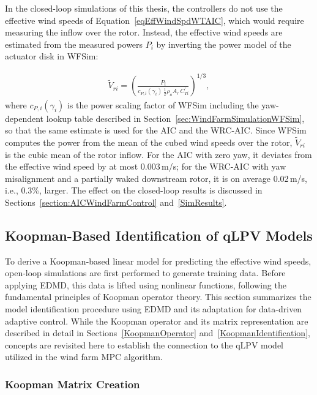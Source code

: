 In the closed-loop simulations of this thesis, the controllers do not use the effective wind speeds of Equation~\eqref{eqEffWindSpdWTAIC}, which would require measuring the inflow over the rotor. Instead, the effective wind speeds are estimated from the measured powers $P_i$ by inverting the power model of the actuator disk in WFSim:

\begin{align} \label{eq:VrFromPower}
    \tilde{V}_{ri} = \left( \frac{P_i}{c_{P,i}(\gamma_i)\, \tfrac{1}{2}\rho_a A_r \, C_{Ti}^\prime} \right)^{1/3},
\end{align}
where $c_{P,i}(\gamma_i)$ is the power scaling factor of WFSim including the yaw-dependent lookup table described in Section~\ref{sec:WindFarmSimulationWFSim}, so that the same estimate is used for the AIC and the WRC-AIC. Since WFSim computes the power from the mean of the cubed wind speeds over the rotor, $\tilde{V}_{ri}$ is the cubic mean of the rotor inflow. For the AIC with zero yaw, it deviates from the effective wind speed by at most 0.003\,m/s; for the WRC-AIC with yaw misalignment and a partially waked downstream rotor, it is on average 0.02\,m/s, i.e., 0.3\%, larger. The effect on the closed-loop results is discussed in Sections~\ref{section:AICWindFarmControl} and~\ref{SimResults}.


\subsection{Koopman-Based Identification of qLPV Models}
To derive a Koopman-based linear model for predicting the effective wind speeds, open-loop simulations are first performed to generate training data. Before applying EDMD, this data is lifted using nonlinear functions, following the fundamental principles of Koopman operator theory. This section summarizes the model identification procedure using EDMD and its adaptation for data-driven adaptive control. While the Koopman operator and its matrix representation are described in detail in Sections~\ref{KoopmanOperator} and~\ref{KoopmanIdentification},  concepts are revisited here to establish the connection to the qLPV model utilized in the wind farm MPC algorithm.

\subsubsection{Koopman Matrix Creation}

